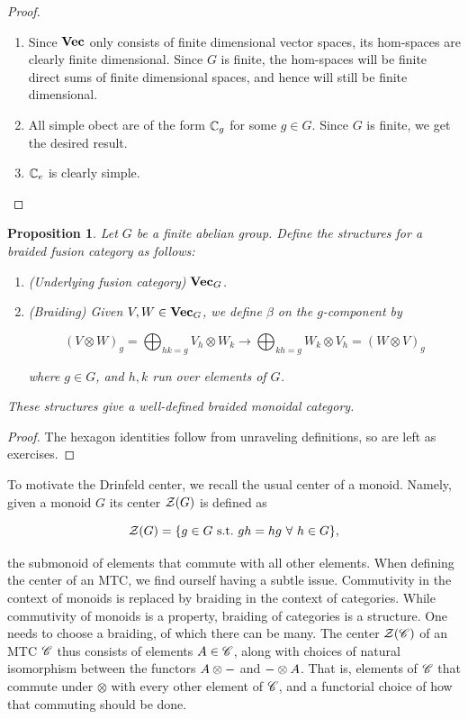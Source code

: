 \documentclass{article}
\newtheorem{proposition}{Proposition}[section]
\theoremstyle{definition}
\numberwithin{figure}{section}
\begin{document}
\begin{proof}
\begin{enumerate}
\item Since $\bold{Vec}$ only consists of finite dimensional vector spaces, its hom-spaces are clearly finite dimensional. Since $G$ is finite, the hom-spaces will be finite direct sums of finite dimensional spaces, and hence will still be finite dimensional.

\item All simple obect are of the form $\mathbb{C}_g$ for some $g\in G$. Since $G$ is finite, we get the desired result.

\item $\mathbb{C}_e$ is clearly simple.

\end{enumerate}
\end{proof}

\begin{proposition} Let $G$ be a finite abelian group. Define the structures for a braided fusion category as follows:

\begin{enumerate}
\item (Underlying fusion category) $\bold{Vec}_G$.
\item (Braiding) Given $V,W\in \bold{Vec}_G$, we define $\beta$ on the $g$-component by

$$\left(V\otimes W\right)_g = \bigoplus_{hk=g}V_h\otimes W_k \xrightarrow{} \bigoplus_{kh=g}W_k\otimes V_h=\left(W\otimes V\right)_g$$

where $g\in G$, and $h,k$ run over elements of $G$.
\end{enumerate}

These structures give a well-defined braided monoidal category.
\end{proposition}
\begin{proof} The hexagon identities follow from unraveling definitions, so are left as exercises.
\end{proof}


To motivate the Drinfeld center, we recall the usual center of a monoid. Namely, given a monoid $G$ its center $\mathcal{Z}(G)$ is defined as

$$\mathcal{Z}(G)=\{g\in G \,\,\mathrm{s.t.}\,\, gh=hg\,\,\forall\,\, h\in G\},$$

the submonoid of elements that commute with all other elements. When defining the center of an MTC, we find ourself having a subtle issue. Commutivity in the context of monoids is replaced by braiding in the context of categories. While commutivity of monoids is a property, braiding of categories is a structure. One needs to choose a braiding, of which there can be many. The center $\mathcal{Z}(\mathscr{C})$ of an MTC $\mathscr{C}$ thus consists of elements $A\in \mathscr{C}$, along with choices of natural isomorphism between the functors $A\otimes \--$ and $\-- \otimes A$. That is, elements of $\mathscr{C}$ that commute under $\otimes$ with every other element of $\mathscr{C}$, and a functorial choice of how that commuting should be done.
\end{document}
